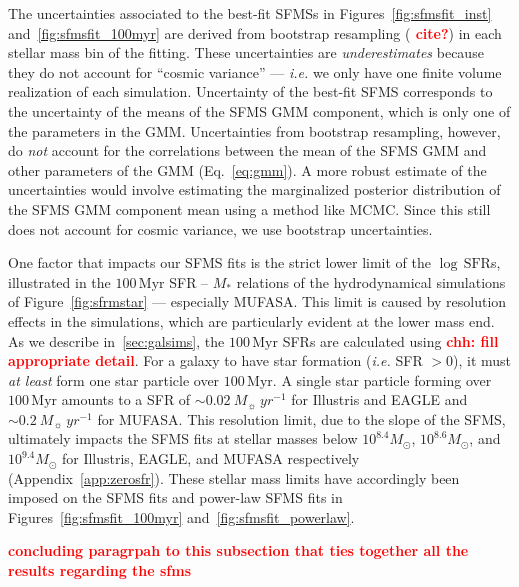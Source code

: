 \documentclass[preprint2,tighten]{aastex62}
\newcommand{\todo}[1]{{\bf \textcolor{red}{ #1}}}
\begin{document}
The uncertainties associated to the best-fit SFMSs in 
Figures~\ref{fig:sfmsfit_inst} and~\ref{fig:sfmsfit_100myr} 
are derived from bootstrap resampling (\todo{cite?}) in each stellar mass 
bin of the fitting. These uncertainties are \emph{underestimates} because 
they do not account for ``cosmic variance'' --- \emph{i.e.} we only have one 
finite volume realization of each simulation. Uncertainty of the best-fit 
SFMS corresponds to the uncertainty of the means of the SFMS GMM component, 
which is only one of the parameters in the GMM. Uncertainties from bootstrap 
resampling, however, do \emph{not} account for the correlations between the 
mean of the SFMS GMM and other
parameters of the GMM (Eq.~\ref{eq:gmm}). A more robust estimate of the 
uncertainties would involve estimating the marginalized posterior distribution 
of the SFMS GMM component mean using a method like MCMC. Since this still 
does not account for cosmic variance, we use bootstrap uncertainties. 

One factor that impacts our SFMS fits is the strict lower limit of the 
$\log\,\mathrm{SFR}$s, illustrated in the $100\,\mathrm{Myr}$ SFR -- 
$M_*$ relations of the hydrodynamical simulations of Figure~\ref{fig:sfrmstar} 
--- especially MUFASA. This limit is caused by resolution effects in 
the simulations, which are particularly evident at the lower mass end. 
As we describe in~\ref{sec:galsims}, the $100\,\mathrm{Myr}$ SFRs are 
calculated using \todo{chh: fill appropriate detail}. For a galaxy to 
have star formation (\emph{i.e.} SFR $> 0$), it must \emph{at least} 
form one star particle over $100\,\mathrm{Myr}$. A single star particle 
forming over $100\,\mathrm{Myr}$ amounts to a SFR of 
$\sim 0.02\ M_{\sun}\ yr^{-1}$ for Illustris and EAGLE and
$\sim 0.2\ M_{\sun}\ yr^{-1}$ for MUFASA. This resolution limit, due to 
the slope of the SFMS, ultimately impacts the 
SFMS fits at stellar masses below $10^{8.4}M_\odot$, $10^{8.6}M_\odot$, 
and $10^{9.4}M_\odot$ for 
Illustris, EAGLE, and MUFASA respectively (Appendix~\ref{app:zerosfr}). 
These stellar mass limits have accordingly been imposed on the SFMS fits
and power-law SFMS fits in Figures~\ref{fig:sfmsfit_100myr} 
and~\ref{fig:sfmsfit_powerlaw}.

\todo{concluding paragrpah to this subsection that ties together all the
results regarding the sfms}
\end{document}
